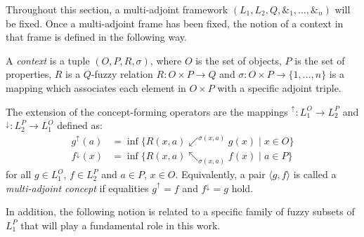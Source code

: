 \documentclass[runningheads,a4paper]{llncs}
\newcommand{\calM}{\mathcal M}
\newcommand{\up}[1][]{{^{\uparrow_{#1}}}}
\newcommand{\down}[1][]{{^{\downarrow^{#1}}}}
\newcommand{\adjoint}{\mathop{\&}\nolimits}
\newcommand{\cred}[1]{{\color{red} #1}}
\newcommand{\cb}[1]{{\color{blue}#1}}
\begin{document}
Throughout this section, a multi-adjoint framework $(L_1, L_2, Q, \adjoint_1, \dots, \adjoint_n)$ will be fixed.
Once a multi-adjoint frame has been fixed, the notion of a context in that frame is defined in the following way.

\begin{definition}
	
A \emph{context} is a tuple $(O, P, R, \sigma)$, where $O$ is the set of objects, $P$ is the set of properties, $R$ is a $Q$-fuzzy relation $R \colon O \times P \to Q$ and $\sigma \colon O \times P \to \{1, \dots, n\}$ is a mapping which associates {each element in $O \times P$ with a specific adjoint triple.}

\end{definition}

The extension of the concept-forming operators are the mappings $\up \colon L_1^O \to L_2^P$ and $\down \colon L_2^P \to L_1^O$ defined as:
\begin{align*}
	g\up(a) &= \inf \{R(x, a) \swarrow^{\sigma(x, a)} g(x) \mid x \in O\} \\
	f\down(x) &= \inf \{R(x, a) \nwarrow_{\sigma(x, a)} f(x) \mid a \in P\}
\end{align*}
for all $g \in L_1^O$, $f \in L_2^P$ and $a \in P$, $x \in O$. Equivalently, a pair $\langle g, f \rangle$ is called a \emph{multi-adjoint concept} if equalities $g\up = f$ and $f\down = g$ hold. %

In addition, the following notion is related to a specific family of fuzzy subsets of $L_1^P$ that will play a fundamental role in this work.
\end{document}
